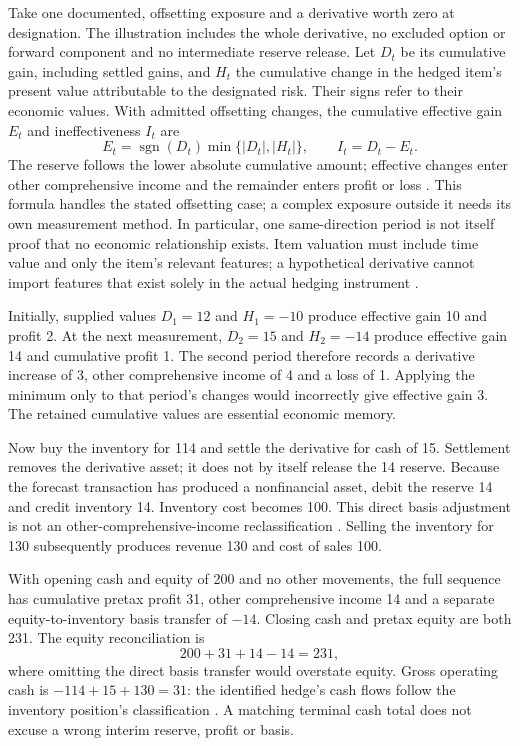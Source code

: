 Take one documented, offsetting exposure and a derivative worth zero at
designation. The illustration includes the whole derivative, no excluded
option or forward component and no intermediate reserve release. Let $D_t$
be its cumulative gain, including settled gains, and $H_t$ the cumulative
change in the hedged item's present value attributable to the designated
risk. Their signs refer to their economic values. With admitted offsetting
changes, the cumulative effective gain $E_t$ and ineffectiveness $I_t$ are
\begin{equation}
 E_t=\operatorname{sgn}(D_t)\min\{|D_t|,|H_t|\},
 \qquad I_t=D_t-E_t.
 \label{eq:hedge-cumulative-lower}
\end{equation}
The reserve follows the lower absolute cumulative amount; effective changes
enter other comprehensive income and the remainder enters profit or loss
\citep[6.5.11]{aasb9dated}. This formula handles the stated offsetting case;
a complex exposure outside it needs its own measurement method. In particular,
one same-direction period is not itself proof that no economic relationship
exists. Item valuation must include time value and only the item's relevant
features; a hypothetical derivative cannot import features that exist solely
in the actual hedging instrument \citep[B6.4.5 and B6.5.4--6]{aasb9dated}.

Initially, supplied values $D_1=12$ and $H_1=-10$ produce effective gain 10
and profit 2. At the next measurement, $D_2=15$ and $H_2=-14$ produce
effective gain 14 and cumulative profit 1. The second period therefore records
a derivative increase of 3, other comprehensive income of 4 and a loss of 1.
Applying the minimum only to that period's changes would incorrectly give
effective gain 3. The retained cumulative values are essential economic memory.

Now buy the inventory for 114 and settle the derivative for cash of 15.
Settlement removes the derivative asset; it does not by itself release the
14 reserve. Because the forecast transaction has produced a nonfinancial
asset, debit the reserve 14 and credit inventory 14. Inventory cost becomes
100. This direct basis adjustment is not an other-comprehensive-income
reclassification \citep[6.5.11(d)(i)]{aasb9dated}. Selling the inventory for
130 subsequently produces revenue 130 and cost of sales 100.

With opening cash and equity of 200 and no other movements, the full sequence
has cumulative pretax profit 31, other comprehensive income 14 and a separate
equity-to-inventory basis transfer of $-14$. Closing cash and pretax equity
are both 231. The equity reconciliation is
\begin{equation}
 200+31+14-14=231,
 \label{eq:hedge-equity-bridge}
\end{equation}
where omitting the direct basis transfer would overstate equity. Gross
operating cash is $-114+15+130=31$: the identified hedge's cash flows follow
the inventory position's classification \citep[16]{aasb107dated}. A matching
terminal cash total does not excuse a wrong interim reserve, profit or basis.

